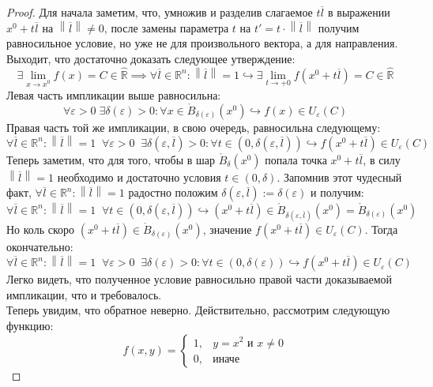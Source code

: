 \documentclass[11pt]{article}
\begin{document}
\begin{proof}
    Для начала заметим, что, умножив и разделив слагаемое $t \overline{l}$ в выражении $x^0 + t \overline{l}$ на $\left\lVert \overline{l} \right\rVert \neq 0$,
    после замены параметра $t$ на $t' = t \cdot \left\lVert \overline{l} \right\rVert$ получим равносильное условие, 
    но уже не для произвольного вектора, а для направления. Выходит, что достаточно доказать следующее утверждение:
    \[\exists \lim_{x \to x^0} f(x) = C \in \widehat{\mathbb{R}} \implies \forall \overline{l} \in \mathbb{R}^n: \left\lVert \overline{l} \right\rVert = 1 
    \hookrightarrow \exists \lim_{t \to +0} f \left(x^0 + t \overline{l} \right) = C \in \widehat{\mathbb{R}} \]
    Левая часть импликации выше равносильна:
    \[\forall \varepsilon > 0 \; \exists \delta(\varepsilon) > 0: \forall x \in \mathring{B}_{\delta(\varepsilon)}\left(x^0\right) \hookrightarrow f(x) \in U_{\varepsilon}(C)\]
    Правая часть той же импликации, в свою очередь, равносильна следующему:
    \[\forall \overline{l} \in \mathbb{R}^n: \left\lVert \overline{l} \right\rVert = 1 \; \; \forall \varepsilon > 0 \; \; \exists \delta \left(\varepsilon, \overline{l}\right) > 0: \forall t \in \left(0, \delta \left(\varepsilon, \overline{l}\right)\right) \hookrightarrow f \left(x^0 + t \overline{l}\right) \in U_{\varepsilon}(C)\]
    Теперь заметим, что для того, чтобы в шар $\mathring{B}_{\delta}\left(x^0\right)$ попала точка $x^0 + t \overline{l}$, в силу $\left\lVert \overline{l} \right\rVert = 1$ необходимо и достаточно условия $t \in (0, \delta)$. Запомнив 
    этот чудесный факт, $\forall \overline{l} \in \mathbb{R}^n: \left\lVert \overline{l} \right\rVert = 1$ радостно положим $\delta\left(\varepsilon, \overline{l} \right) := \delta(\varepsilon)$ и получим:
    \[\forall \overline{l} \in \mathbb{R}^n: \left\lVert \overline{l} \right\rVert = 1 \; \; \forall t \in \left(0, \delta\left(\varepsilon, \overline{l} \right) \right) \hookrightarrow \left(x^0 + t \overline{l}\right) \in \mathring{B}_{\delta\left(\varepsilon, \overline{l} \right)}\left(x^0\right) = \mathring{B}_{\delta(\varepsilon)}\left(x^0\right) \]
    Но коль скоро $\left(x^0 + t \overline{l}\right) \in \mathring{B}_{\delta(\varepsilon)}\left(x^0\right)$, значение $f \left(x^0 + t \overline{l} \right) \in U_{\varepsilon}(C)$. Тогда окончательно:
    \[\forall \overline{l} \in \mathbb{R}^n: \left\lVert \overline{l} \right\rVert = 1 \; \; \forall \varepsilon > 0 \; \; \exists \delta(\varepsilon) > 0 : \forall t \in (0, \delta(\varepsilon)) \hookrightarrow f \left(x^0 + t \overline{l} \right) \in U_{\varepsilon}(C)\]
    Легко видеть, что полученное условие равносильно правой части доказываемой импликации, что и требовалось.
    \\
    Теперь увидим, что обратное неверно. Действительно, рассмотрим следующую функцию:
    \begin{equation*}
        f(x, y) = 
        \begin{cases}
            1, & y = x^2 \text{ и } x \neq 0 \\
            0, & \text{иначе}
        \end{cases}
    \end{equation*}


\end{proof}
\end{document}
